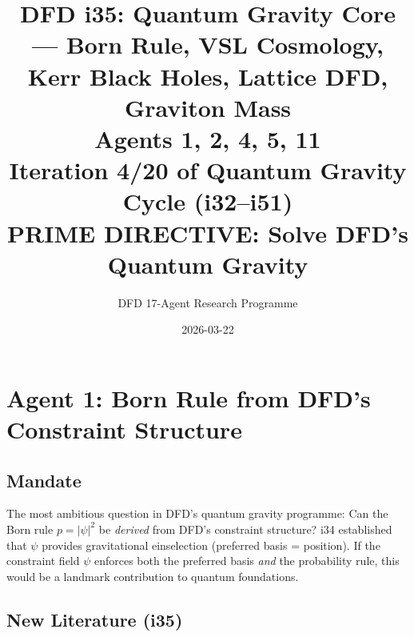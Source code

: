 \documentclass[11pt,a4paper]{article}
\title{DFD i35: Quantum Gravity Core --- Born Rule, VSL Cosmology,\\Kerr Black Holes, Lattice DFD, Graviton Mass\\[6pt]
\large Agents 1, 2, 4, 5, 11\\[6pt]
\normalsize Iteration 4/20 of Quantum Gravity Cycle (i32--i51)\\
PRIME DIRECTIVE: Solve DFD's Quantum Gravity}
\author{DFD 17-Agent Research Programme}
\date{2026-03-22}
\begin{document}
\maketitle
\tableofcontents
\newpage

\section{Agent 1: Born Rule from DFD's Constraint Structure}
\label{sec:agent1}

\subsection{Mandate}

The most ambitious question in DFD's quantum gravity programme: Can the Born rule $p = |\psi|^2$ be \emph{derived} from DFD's constraint structure? i34 established that $\psi$ provides gravitational einselection (preferred basis = position). If the constraint field $\psi$ enforces both the preferred basis \emph{and} the probability rule, this would be a landmark contribution to quantum foundations.

\subsection{New Literature (i35)}
\end{document}

